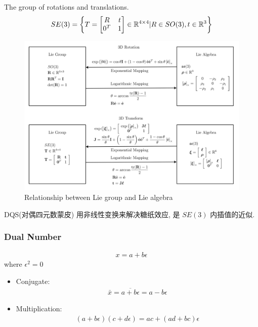 \begin{definition}
    The group of rotations and translations.
    \begin{align*}
        SE(3)=\left\{ T=\begin{bmatrix}
            R & t \\
            0^T & 1
        \end{bmatrix} \in \mathbb{R}^{4\times 4} | R\in SO(3), t\in \mathbb{R}^3 \right\}
    \end{align*}
\end{definition}

\begin{figure}[!htb]
    \centering
    \includegraphics[width=0.88\linewidth]{pic/1057/lie_summary.png}
    \caption{Relationship between Lie group and Lie algebra}
\end{figure}

DQS(对偶四元数蒙皮) 用非线性变换来解决糖纸效应, 是 $SE(3)$ 内插值的近似. 

\subsubsection{Dual Number}
\begin{definition}
    \begin{align*}
        x = a+b\epsilon
    \end{align*}
    where $\epsilon^2 = 0$
\end{definition}

\begin{itemize}
    \item Conjugate: 
    \begin{align*}
        \bar{x} = \overline{a+b\epsilon} = a-b\epsilon 
    \end{align*}
    \item Multiplication:
    \begin{align*}
        (a+b\epsilon)(c+d\epsilon) = ac + (ad+bc)\epsilon
    \end{align*}
\end{itemize}


